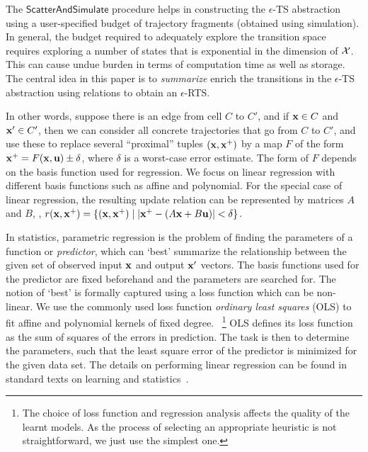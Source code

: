 The $\mathsf{ScatterAndSimulate}$ procedure helps in constructing the
$\epsilon$-TS abstraction using a user-specified budget of trajectory
fragments (obtained using simulation).  In general, the budget
required to adequately explore the transition space requires exploring
a number of states that is exponential in the dimension of
$\mathcal{X}$.  This can cause undue burden in terms of computation
time as well as storage.  The central idea in this paper is to {\em
summarize} enrich the transitions in the $\epsilon$-TS abstraction
using relations to obtain an $\epsilon$-RTS.

In other words, suppose there is an edge from cell $C$ to $C'$, and if
$\mathbf{x} \in C$ and $\mathbf{x}' \in C'$, then we can consider all concrete
trajectories that go from $C$ to $C'$, and use these to replace
several ``proximal'' tuples $(\mathbf{x},\mathbf{x}^{+})$ by a map $F$ of the form
$\mathbf{x}^{+} = F(\mathbf{x}, \mathbf{u}) \pm \delta$, where $\delta$ is a worst-case error
estimate. The form of $F$ depends on the basis function used for
regression. We focus on linear regression with different basis
functions such as affine and polynomial. For the special case of
linear regression, the resulting update relation can be represented by
matrices $A$ and $B$, \ie, $r(\mathbf{x},\mathbf{x}^{+}) = \{(\mathbf{x},\mathbf{x}^{+}) \mid |\mathbf{x}^{+}
- (A\mathbf{x} + B\mathbf{u})| < \delta\}$.

In statistics, parametric regression is the problem of finding the
parameters of a function or \textit{predictor}, which can `best'
summarize the relationship between the given set of observed input
$\mathbf{x}$ and output $\mathbf{x}'$ vectors. The basis functions used for the
predictor are fixed beforehand and the parameters are searched for.
The notion of `best' is formally captured using a loss function which
can be non-linear. We use the commonly used loss function
\textit{ordinary least squares} (OLS) to fit affine and polynomial
kernels of fixed degree.  ~\footnote{The choice of loss function and
regression analysis affects the quality of the learnt models. As the
process of selecting an appropriate heuristic is not straightforward,
we just use the simplest one.} OLS defines its loss function as the
sum of squares of the errors in prediction. The task is then to
determine the parameters, such that the least square error of the
predictor is minimized for the given data set.  The details on
performing linear regression can be found in standard texts on
learning and statistics~\cite{friedman2001elements}.



